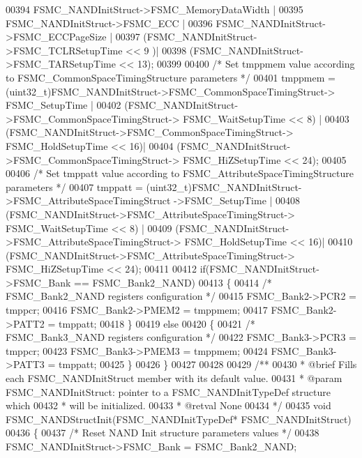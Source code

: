 \begin{DoxyCode}
00394             FSMC\_NANDInitStruct->FSMC_MemoryDataWidth |
00395             FSMC\_NANDInitStruct->FSMC_ECC |
00396             FSMC\_NANDInitStruct->FSMC_ECCPageSize |
00397             (FSMC\_NANDInitStruct->FSMC_TCLRSetupTime << 9 )|
00398             (FSMC\_NANDInitStruct->FSMC_TARSetupTime << 13);
00399 
00400   \textcolor{comment}{/* Set tmppmem value according to FSMC\_CommonSpaceTimingStructure parameters */}
00401   tmppmem = (uint32\_t)FSMC\_NANDInitStruct->FSMC_CommonSpaceTimingStruct->
      FSMC_SetupTime |
00402             (FSMC\_NANDInitStruct->FSMC_CommonSpaceTimingStruct->
      FSMC_WaitSetupTime << 8) |
00403             (FSMC\_NANDInitStruct->FSMC_CommonSpaceTimingStruct->
      FSMC_HoldSetupTime << 16)|
00404             (FSMC\_NANDInitStruct->FSMC_CommonSpaceTimingStruct->
      FSMC_HiZSetupTime << 24);
00405 
00406   \textcolor{comment}{/* Set tmppatt value according to FSMC\_AttributeSpaceTimingStructure parameters */}
00407   tmppatt = (uint32\_t)FSMC\_NANDInitStruct->FSMC_AttributeSpaceTimingStruct
      ->FSMC_SetupTime |
00408             (FSMC\_NANDInitStruct->FSMC_AttributeSpaceTimingStruct->
      FSMC_WaitSetupTime << 8) |
00409             (FSMC\_NANDInitStruct->FSMC_AttributeSpaceTimingStruct->
      FSMC_HoldSetupTime << 16)|
00410             (FSMC\_NANDInitStruct->FSMC_AttributeSpaceTimingStruct->
      FSMC_HiZSetupTime << 24);
00411 
00412   \textcolor{keywordflow}{if}(FSMC\_NANDInitStruct->FSMC_Bank == FSMC_Bank2_NAND)
00413   \{
00414     \textcolor{comment}{/* FSMC\_Bank2\_NAND registers configuration */}
00415     FSMC_Bank2->PCR2 = tmppcr;
00416     FSMC_Bank2->PMEM2 = tmppmem;
00417     FSMC_Bank2->PATT2 = tmppatt;
00418   \}
00419   \textcolor{keywordflow}{else}
00420   \{
00421     \textcolor{comment}{/* FSMC\_Bank3\_NAND registers configuration */}
00422     FSMC_Bank3->PCR3 = tmppcr;
00423     FSMC_Bank3->PMEM3 = tmppmem;
00424     FSMC_Bank3->PATT3 = tmppatt;
00425   \}
00426 \}
00427 
00428 
00429 \textcolor{comment}{/**}
00430 \textcolor{comment}{  * @brief  Fills each FSMC\_NANDInitStruct member with its default value.}
00431 \textcolor{comment}{  * @param  FSMC\_NANDInitStruct: pointer to a FSMC\_NANDInitTypeDef structure which}
00432 \textcolor{comment}{  *         will be initialized.}
00433 \textcolor{comment}{  * @retval None}
00434 \textcolor{comment}{  */}
00435 \textcolor{keywordtype}{void} FSMC_NANDStructInit(FSMC\_NANDInitTypeDef* FSMC\_NANDInitStruct)
00436 \{
00437   \textcolor{comment}{/* Reset NAND Init structure parameters values */}
00438   FSMC\_NANDInitStruct->FSMC_Bank = FSMC_Bank2_NAND;

\end{DoxyCode}
